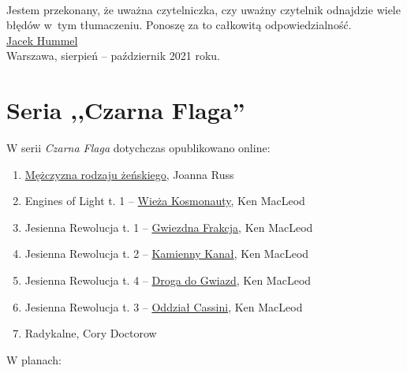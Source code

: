 \documentclass[oneside,polish,11pt,sfheadings]{mwbk}
\begin{document}
~

Jestem przekonany, że uważna czytelniczka, czy uważny czytelnik odnajdzie wiele błędów w~tym tłumaczeniu. Ponoszę za to całkowitą odpowiedzialność.\\

\href{mailto:theskymyladythesky@zoho.eu}{Jacek Hummel}\\

Warszawa, sierpień -- październik 2021 roku.


\chapter*{Seria ,,Czarna Flaga''}

\begin{center}
\begin{large}
W serii \textit{Czarna Flaga} dotychczas opublikowano online:
\end{large} 
\end{center}


\begin{enumerate}
\item \href{https://archive.org/details/joanna-russ-mezczyzna-rodzaju-zenskiego/Joanna_Russ_M\%C4\%99\%C5\%BCczyzna_rodzaju_\%C5\%BCe\%C5\%84skiego}{Mężczyzna rodzaju żeńskiego}, Joanna Russ
\item Engines of Light t. 1 -- \href{https://archive.org/details/ken-macleod-wieza-kosmonauty}{Wieża Kosmonauty}, Ken MacLeod
\item Jesienna Rewolucja t. 1 -- \href{https://archive.org/details/ken-mac-leod-jesienna-rewolucja-gwiezdna-frakcja}{Gwiezdna Frakcja}, Ken MacLeod
\item Jesienna Rewolucja t. 2 -- \href{https://archive.org/details/ken-mac-leod-jesienna-rewolucja-kamienny-kanal}{Kamienny Kanał}, Ken MacLeod
\item Jesienna Rewolucja t. 4 --  \href{https://archive.org/details/ken-mac-leod-jesienna-rewolucja-droga-do-gwiazd}{Droga do Gwiazd}, Ken MacLeod
\item Jesienna Rewolucja t. 3 -- \href{https://archive.org/details/ken-mac-leod-jesienna-rewolucja-oddzial-cassini}{Oddział Cassini}, Ken MacLeod
\item Radykalne, Cory Doctorow
\end{enumerate}

\begin{center}

\begin{large}W planach:\end{large}\end{center}
\end{document}
